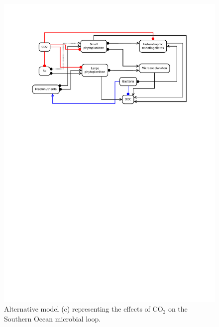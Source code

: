 \documentclass[a4paper]{article}\usepackage[]{graphicx}\usepackage[]{color}
\begin{document}
\begin{figure}[ht]
  \centering
  \includegraphics{Antarctic-c.pdf}
  \caption{Alternative model (c) representing the effects of $\mathrm{CO}_{2}$ on the
  Southern Ocean  microbial loop.}
  \label{fig:Antarctic-c}
\end{figure}
\end{document}
